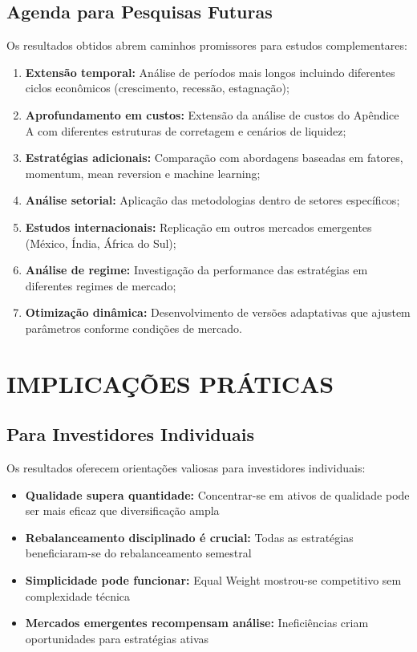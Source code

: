 \subsection{Agenda para Pesquisas Futuras}

Os resultados obtidos abrem caminhos promissores para estudos complementares:

\begin{enumerate}
    \item \textbf{Extensão temporal:} Análise de períodos mais longos incluindo diferentes ciclos econômicos (crescimento, recessão, estagnação);
    
    \item \textbf{Aprofundamento em custos:} Extensão da análise de custos do Apêndice A com diferentes estruturas de corretagem e cenários de liquidez;
    
    \item \textbf{Estratégias adicionais:} Comparação com abordagens baseadas em fatores, momentum, mean reversion e machine learning;
    
    \item \textbf{Análise setorial:} Aplicação das metodologias dentro de setores específicos;
    
    \item \textbf{Estudos internacionais:} Replicação em outros mercados emergentes (México, Índia, África do Sul);
    
    \item \textbf{Análise de regime:} Investigação da performance das estratégias em diferentes regimes de mercado;
    
    \item \textbf{Otimização dinâmica:} Desenvolvimento de versões adaptativas que ajustem parâmetros conforme condições de mercado.
\end{enumerate}

\section{IMPLICAÇÕES PRÁTICAS}

\subsection{Para Investidores Individuais}

Os resultados oferecem orientações valiosas para investidores individuais:

\begin{itemize}
    \item \textbf{Qualidade supera quantidade:} Concentrar-se em ativos de qualidade pode ser mais eficaz que diversificação ampla
    \item \textbf{Rebalanceamento disciplinado é crucial:} Todas as estratégias beneficiaram-se do rebalanceamento semestral
    \item \textbf{Simplicidade pode funcionar:} Equal Weight mostrou-se competitivo sem complexidade técnica
    \item \textbf{Mercados emergentes recompensam análise:} Ineficiências criam oportunidades para estratégias ativas
\end{itemize}

